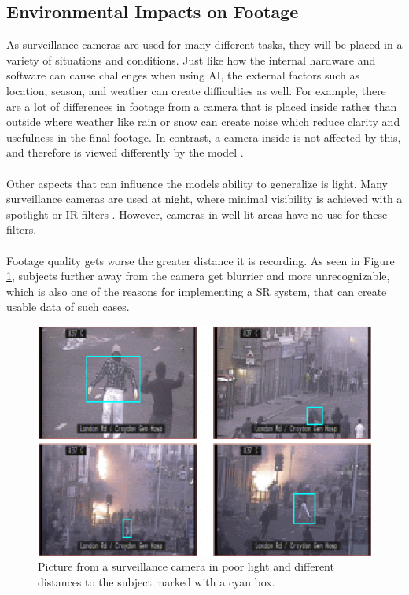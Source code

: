 \subsection{Environmental Impacts on Footage}
As surveillance cameras are used for many different tasks, they will be placed in a variety of situations and conditions. Just like how the internal hardware and software can cause challenges when using \acs{AI}, the external factors such as location, season, and weather can create difficulties as well. For example, there are a lot of differences in footage from a camera that is placed inside rather than outside where weather like rain or snow can create noise which reduce clarity and usefulness in the final footage. In contrast, a camera inside is not affected by this, and therefore is viewed differently by the model \cite{arxiv_superres2021}. 
\\\\
Other aspects that can influence the models ability to generalize is light. Many surveillance cameras are used at night, where minimal visibility is achieved with a spotlight or \acf{IR} filters \cite{nightvision_enhancement2018}. However, cameras in well-lit areas have no use for these filters.
\\\\
Footage quality gets worse the greater distance it is recording. As seen in Figure \ref{fig:camera_distance}, subjects further away from the camera get blurrier and more unrecognizable, which is also one of the reasons for implementing a \acs{SR} system, that can create usable data of such cases. 
\begin{figure}[H]
    \centering
    \includegraphics[width=0.7\linewidth]{figures/images/Typical-images-from-a-single-CCTV-camera-with-poor-lighting-and-long-range-camera-views.png}
    \caption{Picture from a surveillance camera in poor light and different distances to the subject marked with a cyan box.}
    \label{fig:camera_distance}
\end{figure}

